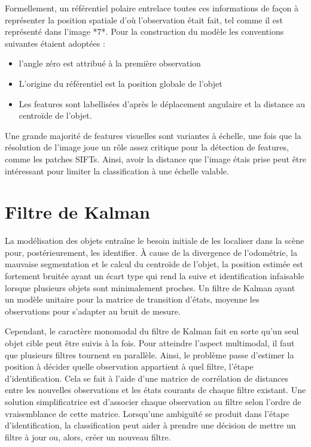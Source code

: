 Formellement, un référentiel polaire entrelace toutes ces informations
de façon à représenter la position spatiale d'où l'observation était
fait, tel comme il est représenté dans l'image *7*. Pour la
construction du modèle les conventions suivantes étaient adoptées :
\begin{itemize}
\item l'angle zéro est attribué à la première observation
\item L'origine du référentiel est la position globale de l’objet
\item Les features sont labellisées d'après le déplacement angulaire
  et la distance au centroïde de l'objet.
\end{itemize}

Une grande majorité de features visuelles sont variantes à échelle, une
fois que la résolution de l’image joue un rôle assez critique pour la
détection de features, comme les patches SIFTs. Ainsi, avoir la distance
que l’image étais prise peut être intéressant pour limiter la
classification à une échelle valable.

\section{Filtre de Kalman }

La modélisation des objets entraîne le besoin initiale de les
localiser dans la scène pour, postérieurement, les identifier. À cause
de la divergence de l'odométrie, la mauvaise segmentation et le calcul
du centroïde de l'objet, la position estimée est fortement bruitée
ayant un écart type qui rend la suive et identification infaisable
lorsque plusieurs objets sont minimalement proches. Un filtre de
Kalman ayant un modèle unitaire pour la matrice de transition d'états,
moyenne les observations pour s'adapter au bruit de mesure.

Cependant, le caractère monomodal du filtre de Kalman fait en sorte
qu'un seul objet cible peut être suivis à la fois. Pour atteindre
l'aspect multimodal, il faut que plusieurs filtres tournent en
parallèle. Ainsi, le problème passe d’estimer la position à décider
quelle observation appartient à quel filtre, l'étape
d'identification. Cela se fait à l'aide d'une matrice de corrélation
de distances entre les nouvelles observations et les états courants de
chaque filtre existant. Une solution simplificatrice est d'associer
chaque observation au filtre selon l'ordre de vraisemblance de cette
matrice. Lorsqu’une ambiguïté se produit dans l'étape
d'identification, la classification peut aider à prendre une décision
de mettre un filtre à jour ou, alors, créer un nouveau filtre.

